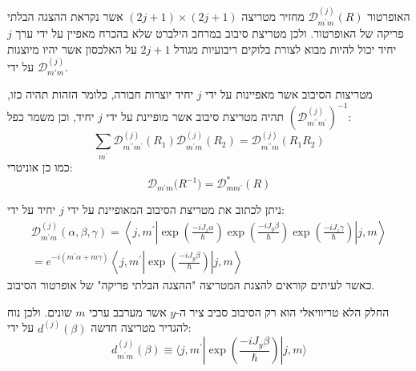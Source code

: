 \documentclass{tstextbook}
\begin{document}
\begin{remark}
האופרטור \({\mathcal{D}}_{m^{\prime}m}^{(j)}(R)\) מחזיר מטריצה \((2j+1)\times (2j+1)\) אשר נקראת ההצגה הבלתי פריקה של האופרטור. ולכן מטריצת סיבוב במרחב הילברט שלא בהכרח מאפיין על ידי ערך \(j\) יחיד יכול להיות מבוא לצורת בלוקים ריבועיות מגודל \(2j+1\) על האלכסון אשר יהיו מיוצגות על ידי \(\mathcal{D}^{(j)}_{m'm}\).

\end{remark}
\begin{proposition}
מטריצות הסיבוב אשר מאפיינות על ידי \(j\) יחיד יוצרות חבורה, כלומר הזהות תהיה כזו,  \((\mathcal{D}_{m^{\prime\prime}m^{\prime}}^{(j)})^{-1}\) תהיה מטריצת סיבוב אשר מופיינת על ידי \(j\) יחיד, וכן משמר כפל:
$$\sum_{m^{\prime}}\mathcal{D}_{m^{\prime\prime}m^{\prime}}^{(j)}(R_{1})\mathcal{D}_{m^{\prime}m}^{(j)}(R_{2})=\mathcal{D}_{m^{\prime\prime}m}^{(j)}(R_{1}R_{2})$$
כמו כן אוניטרי:
$$\mathcal{D}_{m^{\prime}m}\big(R^{-1}\big)=\mathcal{D}_{m m^{\prime}}^{*}(R)$$

\end{proposition}
\begin{proposition}
ניתן לכתוב את מטריצת הסיבוב המאופיינת על ידי \(j\) יחיד על ידי:
\begin{gather*}\mathcal{D}_{m^{\prime}m}^{(j)}\left( \alpha,\beta,\gamma \right)=\left\langle  j,m^{\prime}|\exp\left(\frac{-iJ_{z}\alpha}{\hbar}\right)\exp\left(\frac{-iJ_{y}\beta}{\hbar}\right)\exp\left(\frac{-iJ_{z}\gamma}{\hbar}\right)|j,m \right\rangle\\=e^{-i\left( m^{\prime}\alpha+m\gamma \right)}\left\langle  j,m^{\prime}|\exp\left(\frac{-iJ_{y}\beta}{\hbar}\right)|j,m \right\rangle 
\end{gather*}
כאשר לעיתים קוראים להצגת המטריצה "ההצגה הבלתי פריקה" של אופרטור הסיבוב.

\end{proposition}
\begin{symbolize}
החלק הלא טריוויאלי הוא רק הסיבוב סביב ציר ה-\(y\) אשר מערבב ערכי \(m\) שונים. ולכן נוח להגדיר מטריצה חדשה \(d^{(j)}\left( \beta \right)\) על ידי:
$$d_{m^{\prime}m}^{(j)}(\beta)\equiv\langle j,m^{\prime}|\exp\left(\frac{-i J_{y}\beta}{\hbar}\right)|j,m\rangle$$

\end{symbolize}
\end{document}
